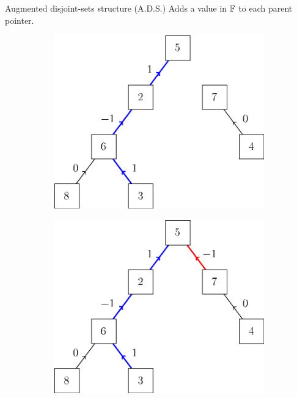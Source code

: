 \begin{frame}{Augmented disjoint-sets structure (A.D.S.)}
	Adds a value in $\mathbb{F}$ to each parent pointer.
	\begin{figure}
		\centering
		\begin{subfigure}{0.45\textwidth}
			\includegraphics[width=\linewidth]{ds/augmented_disjoint_find}
		\end{subfigure}%
		\hspace{0.045\textwidth}%
		\vline%
		\hspace{0.045\textwidth}%
		\begin{subfigure}{0.45\textwidth}
			\includegraphics[width=\linewidth]{ds/augmented_disjoint_link}
		\end{subfigure}%
	\end{figure}
\end{frame}

